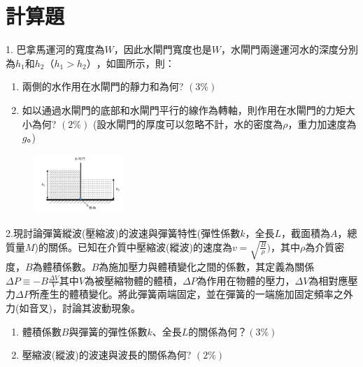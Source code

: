 \documentclass[cn,10pt,math=newtx,chinesefont=founder,device=ig]{elegantbook}
\begin{document}
\section{計算題}

\begin{example}
   1.	巴拿馬運河的寬度為$W$，因此水閘門寬度也是$W$，水閘門兩邊運河水的深度分別為$h_1$和$h_2 （ℎ_1 > ℎ_2）$，如圖所示，則：
   \begin{enumerate}[label=(\arabic*)] 
\item 兩側的水作用在水閘門的靜力和為何?  $( 3\% )$
\item 如以通過水閘門的底部和水閘門平行的線作為轉軸，則作用在水閘門的力矩大小為何?  $( 2\% )$
(設水閘門的厚度可以忽略不計，水的密度為$\rho$，重力加速度為$g$。)
\end{enumerate}

    \rightline{[成德高中教甄109]}
\end{example}
\begin{solution}
    
\end{solution}
\begin{figure}[htbp]
    \flushright
    \includegraphics[width=0.3\textwidth]{image/109成德41.png}
  \end{figure}
\newpage



\begin{example}
   	2.現討論彈簧縱波(壓縮波)的波速與彈簧特性(彈性係數$k$，全長$L$，截面積為$A$，總質量$M$)的關係。已知在介質中壓縮波(縱波)的速度為$v=\sqrt{\frac{B}{\rho}})$，其中$\rho$為介質密度，$B$為體積係數。$B$為施加壓力與體積變化之間的係數，其定義為關係$ \Delta P\equiv-B \frac{\Delta V}{V}$其中$V$為被壓縮物體的體積，$\Delta P$為作用在物體的壓力，$\Delta V$為相對應壓力$\Delta P$所產生的體積變化。將此彈簧兩端固定，並在彈簧的一端施加固定頻率之外力(如音叉)，討論其波動現象。
   	\begin{enumerate}[label=(\arabic*)] 
\item 體積係數$B$與彈簧的彈性係數$k$、全長$L$的關係為何？$( 3\% )$
\item 壓縮波(縱波)的波速與波長的關係為何?  $( 2\%)$
\end{enumerate}
    \rightline{[成德高中教甄109]}
\end{example}
\begin{solution}
    
\end{solution}
\end{document}
